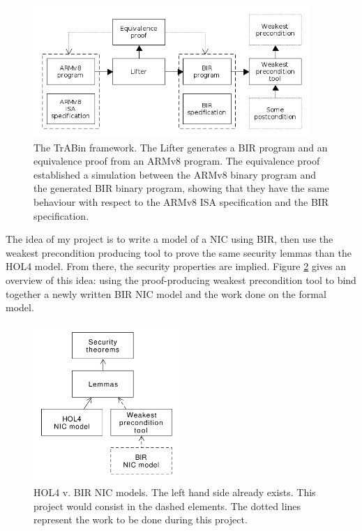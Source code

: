 \documentclass{kththesis}
\begin{document}
\begin{figure}[!ht]
	\includegraphics[height=5cm]{figures/trabin-overview.png}
	\centering
	\caption{
The TrABin framework. The Lifter generates a BIR program and an equivalence proof from an ARMv8 program. The equivalence proof established a simulation between the ARMv8 binary program and the generated BIR binary program, showing that they have the same behaviour with respect to the ARMv8 ISA specification and the BIR specification.
}
	\label{trabin-overview}
\end{figure}

The idea of my project is to write a model of a NIC using BIR, then use the weakest precondition producing tool to prove the same security lemmas than the HOL4 model. From there, the security properties are implied. Figure \ref{hol-v-bir-nic-model-simple} gives an overview of this idea: using the proof-producing weakest precondition tool to bind together a newly written BIR NIC model and the work done on the formal model.

\begin{figure}[!ht]
	\includegraphics[height=6cm]{figures/figure-2.png}
	\centering
	\caption{
HOL4 v. BIR NIC models. The left hand side already exists. This project would consist in the dashed elements. The dotted lines represent the work to be done during this project.
}
	\label{hol-v-bir-nic-model-simple}
\end{figure}
\end{document}
